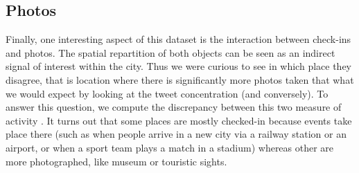 \subsection{Photos}

Finally, one interesting aspect of this dataset is the interaction between
check-ins and photos.  The spatial repartition of both objects can be seen as
an indirect signal of interest within the city. Thus we were curious to see in
which place they disagree, that is location where there is significantly more
photos taken that what we would expect by looking at the tweet concentration
(and conversely). To answer this question, we compute the discrepancy between
this two measure of activity \autocite{Agarwal2006spatial}. It turns out that
some places are mostly checked-in because events take place there (such as when
people arrive in a new city via a railway station or an airport, or when a
sport team plays a match in a stadium) whereas other are more photographed,
like museum or touristic sights.

